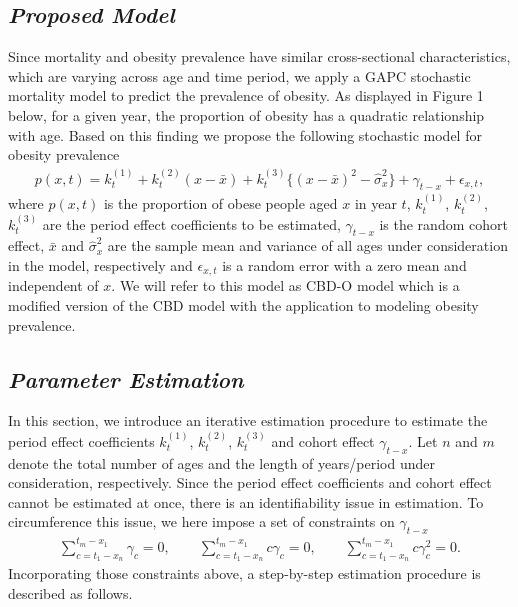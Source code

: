 \documentclass[11pt,letterpaper]{article}
\numberwithin{equation}{section}
\begin{document}
\subsection{\textit{Proposed Model}}
Since mortality and obesity prevalence have similar cross-sectional characteristics, which are varying across age and time period, we apply a GAPC stochastic mortality model to predict the prevalence of obesity.
As displayed in Figure 1 below,  for a given year, the proportion of obesity has a quadratic relationship with age.  Based on this finding we propose the following stochastic model for obesity prevalence
\begin{eqnarray}
\label{eq:proposed}
p(x,t)=k_t^{(1)}+ k_t^{(2)}(x - \bar{x}) + k_t^{(3)}\{(x - \bar{x})^{2} - \hat\sigma_x^{2}\} + \gamma_{t-x}+\epsilon_{x,t},
\end{eqnarray}
where $p(x,t)$ is the  proportion of obese people aged $x$ in year $t$,
$k_t^{(1)}$, $k_t^{(2)}$, $k_t^{(3)}$ are the period effect coefficients to be estimated,
$\gamma_{t-x}$ is the random cohort effect,
$\bar x$ and $\hat\sigma_x^2$ are the sample mean and  variance of  all ages under consideration in the model, respectively and $\epsilon_{x,t}$ is a random error with a zero mean and  independent of $x$. We will refer to this model as CBD-O model which is a modified version of the CBD model with the application to modeling obesity prevalence.

\subsection{\textit{Parameter Estimation}}
In this section, we introduce an iterative estimation procedure to estimate the period effect coefficients $k_t^{(1)}$, $k_t^{(2)}$, $k_t^{(3)}$ and  cohort effect $\gamma_{t-x}$.  Let $n$ and $m$ denote  the total number of ages and the length of years/period under consideration, respectively.
 Since the period effect coefficients and cohort effect cannot be estimated at once, there is an identifiability issue in estimation. To circumference this issue, we here impose a set of constraints on $\gamma_{t-x}$
\begin{eqnarray}\label{eq:constraint}
\sum_{c=t_1-x_n}^{t_m-x_1}\gamma_c=0 ,\quad\quad \sum_{c=t_1-x_n}^{t_m-x_1}c\gamma_c=0,\quad\quad \sum_{c=t_1-x_n}^{t_m-x_1}c\gamma_c^2=0.
\end{eqnarray}
Incorporating those constraints above, a step-by-step estimation procedure is described as follows.
\end{document}
